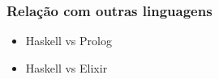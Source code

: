 \begin{frame}
    \frametitle{Relação com outras linguagens}

    \begin{itemize}
      \item Haskell vs Prolog
      \item Haskell vs Elixir
    \end{itemize}

\end{frame}